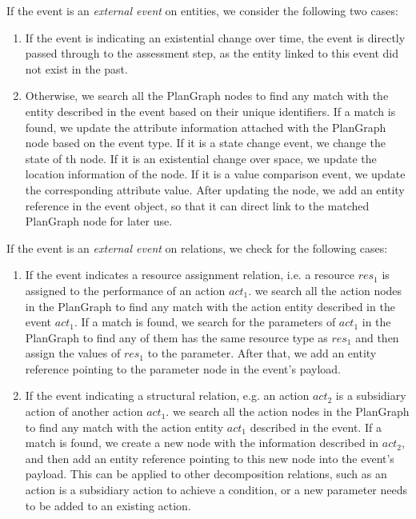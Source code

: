 If the event is an \emph{external event} on entities, we consider the following two cases:
\begin{enumerate}
	\item If the event is indicating an existential change over time, the event is directly passed through to the assessment step, as the entity linked to this event did not exist in the past.
	\item Otherwise, we search all the PlanGraph nodes to find any match with the entity described in the event based on their unique identifiers. If a match is found, we update the attribute information attached with the PlanGraph node based on the event type. If it is a state change event, we change the state of th node. If it is an existential change over space, we update the location information of the node. If it is a value comparison event, we update the corresponding attribute value. After updating the node, we add an entity reference in the event object, so that it can direct link to the matched PlanGraph node for later use.
\end{enumerate}

If the event is an \emph{external event} on relations, we check for the following cases:
\begin{enumerate}
	\item If the event indicates a resource assignment relation, i.e. a resource $res_1$ is assigned to the performance of an action $act_1$. we search all the action nodes in the PlanGraph to find any match with the action entity described in the event $act_1$. If a match is found, we search for the parameters of $act_1$ in the PlanGraph to find any of them has the same resource type as $res_1$ and then assign the values of $res_1$ to the parameter. After that, we add an entity reference pointing to the parameter node in the event's payload. 
	\item If the event indicating a structural relation, e.g. an action $act_2$ is a subsidiary action of another action $act_1$. we search all the action nodes in the PlanGraph to find any match with the action entity $act_1$ described in the event. If a match is found, we create a new node with the information described in $act_2$, and then add an entity reference pointing to this new node into the event's payload. This can be applied to other decomposition relations, such as an action is a subsidiary action to achieve a condition, or a new parameter needs to be added to an existing action.
\end{enumerate}

